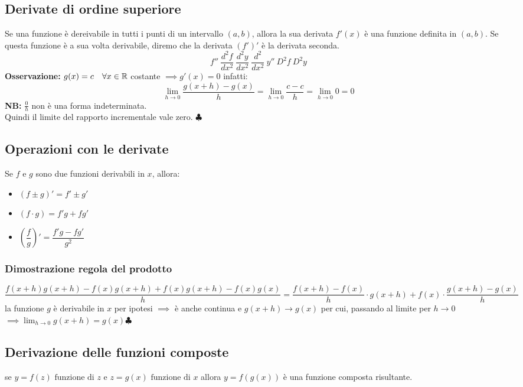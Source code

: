 \documentclass[../../main.tex]{subfiles}
\begin{document}
\subsection{Derivate di ordine superiore}
Se una funzione è dereivabile in tutti i punti di un intervallo $(a, b)$, allora la sua derivata
$f'(x)$ è una funzione definita in $(a, b)$. Se questa funzione è a sua volta derivabile, diremo che la derivata
$(f')'$ è la derivata seconda.
\[
    f'' \ \frac{d^2f}{dx^2} \ \frac{d^2y}{dx^2} \ \frac{d^2}{dx^2} \ y'' \ D^2f \ D^2y
\]
\textbf{Osservazione:} $g(x) = c \ \ \ \forall x\in\R$ costante $\implies g'(x) = 0$ infatti:
\[
    \lim_{h\to 0} \dfrac{g(x+h) - g(x)}{h} = \lim_{h\to 0} \dfrac{c - c}{h} = \lim_{h\to 0} 0 = 0
\]
\textbf{NB:} $\frac{0}{h}$ non è una forma indeterminata.\\

Quindi il limite del rapporto incrementale vale zero. $\clubsuit$

\subsection{Operazioni con le derivate}
Se $f$ e $g$ sono due funzioni derivabili in $x$, allora:
\begin{itemize}
    \item $(f\pm g)' = f'\pm g'$
    \item $(f \cdot g) = f'g + fg'$
    \item $\left(\dfrac{f}{g}\right)' = \dfrac{f'g - fg'}{g^2}$
\end{itemize}

\subsubsection{Dimostrazione regola del prodotto}
\[
    \dfrac{f(x+h)g(x+h) - f(x)  g(x+h) + f(x)g(x+h) - f(x)g(x)}{h} = \dfrac{f(x+h) - f(x)}{h} \cdot g(x+h) + f(x) \cdot \dfrac{g(x+h) - g(x)}{h}
\]
la funzione $g$ è derivabile in $x$ per ipotesi $\implies$ è anche continua e $g(x+h) \to g(x)$ per cui, passando al limite per
$h\to 0$ $\implies \lim_{h\to0} g(x+h) = g(x) \clubsuit$

\subsection{Derivazione delle funzioni composte}
se $y = f(z) \text{ funzione di } z$ e $z = g(x) \text{ funzione di } x$ allora $y = f(g(x))$ è una funzione composta risultante.
\end{document}
